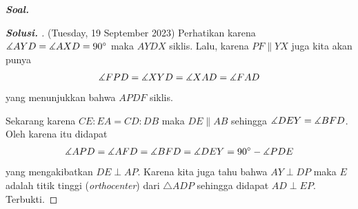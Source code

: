 \textbf{\textit{Soal. }}
\begin{proof}[\textbf{Solusi. }] (Tuesday, 19 September 2023) Perhatikan karena $\measuredangle AYD = \measuredangle AXD = 90^\circ$ maka $AYDX$ siklis. Lalu, karena $PF \parallel YX$ juga kita akan punya
\begin{align*}
    \measuredangle FPD = \measuredangle XYD = \measuredangle XAD = \measuredangle FAD
\end{align*}
yang menunjukkan bahwa $APDF$ siklis. 

% 


Sekarang karena $CE:EA=CD:DB$ maka $DE \parallel AB$ sehingga $\measuredangle DEY = \measuredangle BFD$. Oleh karena itu didapat
\begin{align*}
    \measuredangle APD = \measuredangle AFD = \measuredangle BFD = \measuredangle DEY = 90^\circ - \measuredangle PDE
\end{align*}
yang mengakibatkan $DE \perp AP$. Karena kita juga tahu bahwa $AY \perp DP$ maka $E$ adalah titik tinggi (\textit{orthocenter}) dari $\triangle ADP$ sehingga didapat $AD \perp EP$. Terbukti.
\end{proof}